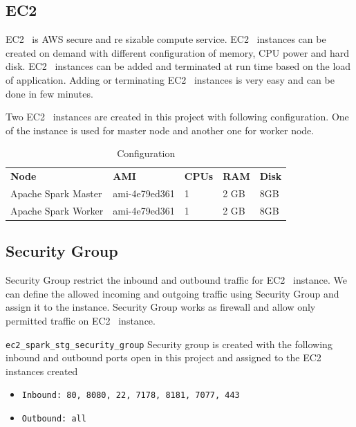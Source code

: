 \subsection{EC2}

EC2~\cite{hid-sp18-511-www-ec2} is AWS secure and re sizable compute
service. EC2~\cite{hid-sp18-511-www-ec2} instances can be created on
demand with different configuration of memory, CPU power and hard
disk. EC2~\cite{hid-sp18-511-www-ec2} instances can be added and
terminated at run time based on the load of application. Adding or
terminating EC2~\cite{hid-sp18-511-www-ec2} instances is very easy and can
be done in few minutes.

Two EC2~\cite{hid-sp18-511-www-ec2} instances are created in this project with following
configuration. One of the instance is used for master node and another one
for worker node.

\begin{table}[hbt]
	\centering
	\caption{Configuration}\label{t:ec2-configuration}
	\begin{tabular}{lllll} 
		\textbf{Node} & \textbf{AMI} & \textbf{CPUs} & \textbf{RAM} & \textbf{Disk}\\ 
		Apache Spark Master & ami-4e79ed361 & 1 & 2 GB & 8GB\\
		Apache Spark Worker & ami-4e79ed361 & 1 & 2 GB & 8GB\\
	\end{tabular}
\end{table}

\subsection{Security Group}

Security Group restrict the inbound and outbound traffic for
EC2~\cite{hid-sp18-511-www-ec2} instance.  We can define the allowed
incoming and outgoing traffic using Security Group and assign it to
the instance.  Security Group works as firewall and allow only
permitted traffic on EC2~\cite{hid-sp18-511-www-ec2} instance.

\verb|ec2_spark_stg_security_group| Security group is created with the
following inbound and outbound ports open in this project and assigned to the
EC2~\cite{hid-sp18-511-www-ec2} instances created

\begin{itemize}
	\item \verb|Inbound: 80, 8080, 22, 7178, 8181, 7077, 443|
	\item \verb|Outbound: all|
	
\end{itemize}

